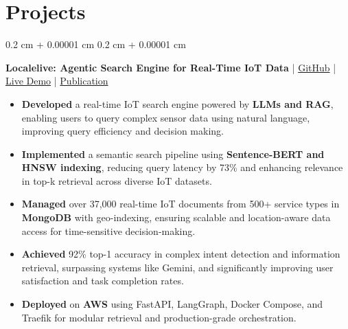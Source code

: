 \documentclass[10pt, letterpaper]{article}
\newenvironment{highlights}{
    \begin{itemize}[
        topsep=0.10 cm,
        parsep=0.10 cm,
        partopsep=0pt,
        itemsep=0pt,
        leftmargin=0.4 cm + 10pt
    ]
}{
    \end{itemize}
} %
\newenvironment{onecolentry}{
    \begin{adjustwidth}{
        0.2 cm + 0.00001 cm
    }{
        0.2 cm + 0.00001 cm
    }
}{
    \end{adjustwidth}
} %
\let\hrefWithoutArrow\href
\renewcommand{\href}[2]{\hrefWithoutArrow{#1}{#2}}
\begin{document}
        


    \vspace{-0.2cm}
    \section{Projects}


\begin{onecolentry}
\textbf{Localelive: Agentic Search Engine for Real-Time IoT Data} | \href{https://github.com/SensorsConnect/IoT-Agentic-Search-Engine}{GitHub} | \href{https://localelive.space/}{Live Demo} | \href{https://www.mdpi.com/1424-8220/25/19/5995}{Publication}
\begin{highlights}
    \item \textbf{Developed} a real-time IoT search engine powered by \textbf{LLMs and RAG}, enabling users to query complex sensor data using natural language, improving query efficiency and decision making. %
    
    \item \textbf{Implemented} a semantic search pipeline using \textbf{Sentence-BERT and HNSW indexing}, reducing query latency by 73\% and enhancing relevance in top-k retrieval across diverse IoT datasets.
    
    \item \textbf{Managed} over 37,000 real-time IoT documents from 500+ service types in \textbf{MongoDB} with geo-indexing, ensuring scalable and location-aware data access for time-sensitive decision-making.
    
    \item \textbf{Achieved} 92\% top-1 accuracy in complex intent detection and information retrieval, surpassing systems like Gemini, and significantly improving user satisfaction and task completion rates. %
        
    \item \textbf{Deployed} on \textbf{AWS} using FastAPI, LangGraph, Docker Compose, and Traefik for modular retrieval and production-grade orchestration.

    
\end{highlights}
\end{onecolentry}
\end{document}
